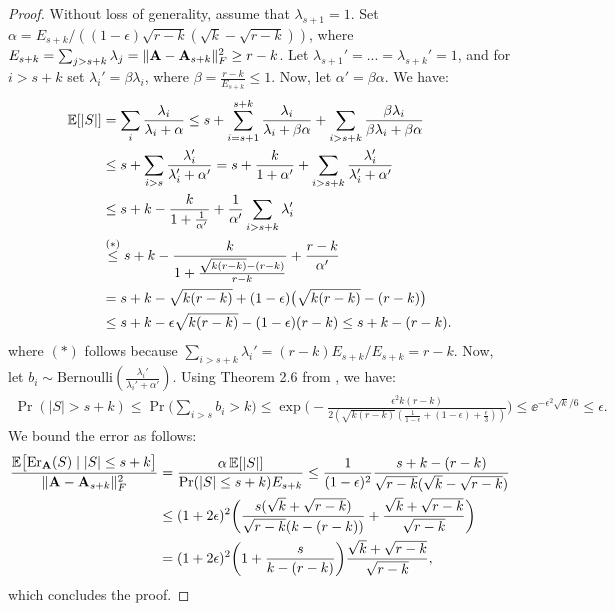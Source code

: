 \documentclass{article}
\begin{document}
  \begin{proof}
    Without loss of generality, assume that $\lambda_{s+1}=1$. Set
    $\alpha=E_{s+k}/((1-\epsilon)\sqrt{r-k}(\sqrt k-\sqrt{r-k}))$, where
    $E_{s+k}=\sum_{j>s+k}\lambda_j=\|\mathbf A-\mathbf A_{s+k}\|_F^2\geq r-k$. Let 
    $\lambda_{s+1}'=...=\lambda_{s+k}'=1$, and for $i>s+k$ set
    $\lambda_i'=\beta\lambda_i$, where $\beta = \frac{r-k}{E_{s+k}}\leq 1$. Now, let $\alpha'=\beta\alpha$. We have:
  \begin{align*}
    \mathbb E[|S|] &= \sum_{i}\frac{\lambda_i}{\lambda_i+\alpha} 
   \leq s + \sum_{i=s+1}^{s+k}\frac{\lambda_i}{\lambda_i+\beta\alpha}
    + \sum_{i>s+k}\frac{\beta\lambda_i}{\beta\lambda_i+\beta\alpha}\\
&   \leq s + \sum_{i>s} \frac{\lambda_i'}{\lambda_i'+\alpha'}
=s + \frac{k}{1+\alpha'} + \sum_{i>s+k}\frac{\lambda_i'}{\lambda_i'+\alpha'}\\
    &\leq s+
k - \frac k{1+\frac1{\alpha'}}+  \frac1{\alpha'} \sum_{i>s+k} \lambda_i' \\
    &\overset{(*)}{\leq} s + k - \frac k{1 + \frac{\sqrt{k(r-k)} - (r-k)}{r-k}}
      +\frac{r-k}{\alpha'}\\
    &=s + k - \sqrt{k(r-k)} + (1-\epsilon)\big(\sqrt{k(r-k)} -
      (r-k)\big)\\
            &\leq s+k -\epsilon \sqrt{k(r-k)} - (1-\epsilon)(r-k)
              \leq s+k-(r-k).
  \end{align*}
  where $(*)$ follows because
  $\sum_{i>s+ k}\lambda_i'=(r-k)E_{s+k}/E_{s+k}=r-k$.
  Now, let
  $b_i\sim\mathrm{Bernoulli}(\frac{\lambda_i'}{\lambda_i'+\alpha'})$. Using
  Theorem 2.6 from \cite{ChungLu2006book}, we have:
  \begin{align*}
    \Pr(|S|>s+k) \leq \Pr\Big(\sum_{i>s}b_i>k\Big)\leq
    \exp\Big(-\frac{\epsilon^2k(r-k)}{2(\sqrt{k(r-k)}(\frac1{1-\epsilon}+(1-\epsilon)+\frac\epsilon
   3))}\Big)\leq \ee^{-\epsilon^2\sqrt{k}/6}\leq \epsilon.
  \end{align*}
  We bound the error as follows: 
    \begin{align*}
      \frac{\mathbb E\big[\mathrm{Er}_\mathbf A(S)\mid |S|\leq
      s+k\big]}{\|\mathbf A-\mathbf A_{s+k}\|_F^2}
      &= \frac{\alpha\,\mathbb E[|S|]}{\mathrm{Pr}(|S|\leq s+k)E_{s+k}}\leq
      \frac1{(1-\epsilon)^2}\frac{s+k-(r-k)}{\sqrt{r-k}(\sqrt k-\sqrt{r-k})}\\
      &\leq(1+2\epsilon)^2\bigg(\frac{s(\sqrt{k}+\sqrt{r-k})}{\sqrt{r-k}(k-(r-k))}+\frac{\sqrt k
        +\sqrt{r-k}}{\sqrt{r-k}}\bigg) \\
      &=(1+2\epsilon)^2\bigg(1 +
        \frac{s}{k-(r-k)}\bigg) \frac{\sqrt k +\sqrt{r-k}}{\sqrt{r-k}},
    \end{align*}
which concludes the proof.
  \end{proof}
\end{document}
